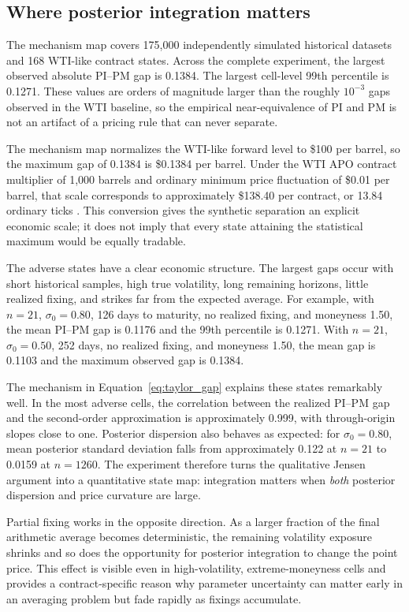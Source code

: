 \subsection{Where posterior integration matters}

The mechanism map covers 175,000 independently simulated historical datasets and 168 WTI-like contract states. Across the complete experiment, the largest observed absolute PI--PM gap is 0.1384. The largest cell-level 99th percentile is 0.1271. These values are orders of magnitude larger than the roughly $10^{-3}$ gaps observed in the WTI baseline, so the empirical near-equivalence of PI and PM is not an artifact of a pricing rule that can never separate.

The mechanism map normalizes the WTI-like forward level to \$100 per barrel, so the maximum gap of 0.1384 is \$0.1384 per barrel. Under the WTI APO contract multiplier of 1,000 barrels and ordinary minimum price fluctuation of \$0.01 per barrel, that scale corresponds to approximately \$138.40 per contract, or 13.84 ordinary ticks \cite{cme_wti_apo_rule}. This conversion gives the synthetic separation an explicit economic scale; it does not imply that every state attaining the statistical maximum would be equally tradable.

The adverse states have a clear economic structure. The largest gaps occur with short historical samples, high true volatility, long remaining horizons, little realized fixing, and strikes far from the expected average. For example, with $n=21$, $\sigma_0=0.80$, 126 days to maturity, no realized fixing, and moneyness 1.50, the mean PI--PM gap is 0.1176 and the 99th percentile is 0.1271. With $n=21$, $\sigma_0=0.50$, 252 days, no realized fixing, and moneyness 1.50, the mean gap is 0.1103 and the maximum observed gap is 0.1384.

The mechanism in Equation~\eqref{eq:taylor_gap} explains these states remarkably well. In the most adverse cells, the correlation between the realized PI--PM gap and the second-order approximation is approximately 0.999, with through-origin slopes close to one. Posterior dispersion also behaves as expected: for $\sigma_0=0.80$, mean posterior standard deviation falls from approximately 0.122 at $n=21$ to 0.0159 at $n=1260$. The experiment therefore turns the qualitative Jensen argument into a quantitative state map: integration matters when \emph{both} posterior dispersion and price curvature are large.

Partial fixing works in the opposite direction. As a larger fraction of the final arithmetic average becomes deterministic, the remaining volatility exposure shrinks and so does the opportunity for posterior integration to change the point price. This effect is visible even in high-volatility, extreme-moneyness cells and provides a contract-specific reason why parameter uncertainty can matter early in an averaging problem but fade rapidly as fixings accumulate.

